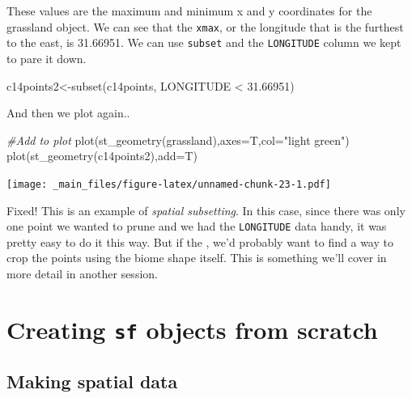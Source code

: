 \documentclass[
]{book}
\newenvironment{Shaded}{\begin{snugshade}}{\end{snugshade}}
\newcommand{\AttributeTok}[1]{\textcolor[rgb]{0.77,0.63,0.00}{#1}}
\newcommand{\CommentTok}[1]{\textcolor[rgb]{0.56,0.35,0.01}{\textit{#1}}}
\newcommand{\FloatTok}[1]{\textcolor[rgb]{0.00,0.00,0.81}{#1}}
\newcommand{\FunctionTok}[1]{\textcolor[rgb]{0.00,0.00,0.00}{#1}}
\newcommand{\NormalTok}[1]{#1}
\newcommand{\OtherTok}[1]{\textcolor[rgb]{0.56,0.35,0.01}{#1}}
\newcommand{\SpecialCharTok}[1]{\textcolor[rgb]{0.00,0.00,0.00}{#1}}
\newcommand{\StringTok}[1]{\textcolor[rgb]{0.31,0.60,0.02}{#1}}
\begin{document}
These values are the maximum and minimum x and y coordinates for the grassland object. We can see that the \texttt{xmax}, or the longitude that is the furthest to the east, is 31.66951. We can use \texttt{subset} and the \texttt{LONGITUDE} column we kept to pare it down.

\begin{Shaded}
\begin{Highlighting}[]
\NormalTok{c14points2}\OtherTok{\textless{}{-}}\FunctionTok{subset}\NormalTok{(c14points, LONGITUDE }\SpecialCharTok{\textless{}} \FloatTok{31.66951}\NormalTok{)}
\end{Highlighting}
\end{Shaded}

And then we plot again..

\begin{Shaded}
\begin{Highlighting}[]
\CommentTok{\#Add to plot}
\FunctionTok{plot}\NormalTok{(}\FunctionTok{st\_geometry}\NormalTok{(grassland),}\AttributeTok{axes=}\NormalTok{T,}\AttributeTok{col=}\StringTok{"light green"}\NormalTok{)}
\FunctionTok{plot}\NormalTok{(}\FunctionTok{st\_geometry}\NormalTok{(c14points2),}\AttributeTok{add=}\NormalTok{T)}
\end{Highlighting}
\end{Shaded}

\texttt{[image: \_main\_files/figure-latex/unnamed-chunk-23-1.pdf]}

Fixed! This is an example of \emph{spatial subsetting}. In this case, since there was only one point we wanted to prune and we had the \texttt{LONGITUDE} data handy, it was pretty easy to do it this way. But if the , we'd probably want to find a way to crop the points using the biome shape itself. This is something we'll cover in more detail in another session.

\hypertarget{creating-sf-objects-from-scratch}{%
\chapter{\texorpdfstring{Creating \texttt{sf} objects from scratch}{Creating sf objects from scratch}}\label{creating-sf-objects-from-scratch}}

\hypertarget{making-spatial-data}{%
\section{Making spatial data}\label{making-spatial-data}}
\end{document}
